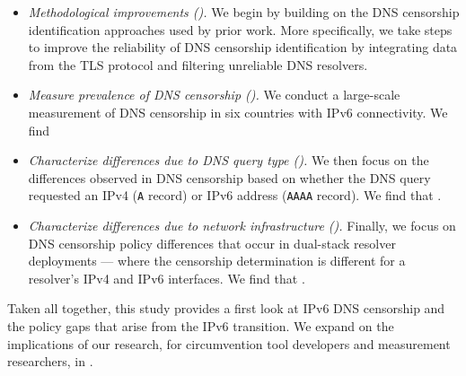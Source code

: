 \begin{itemize}

  \item {\it Methodological improvements ().} 
    We begin by building on the DNS censorship identification approaches used
    by prior work. More specifically, we take steps to improve the reliability
    of DNS censorship identification by integrating data from the TLS protocol
    and filtering unreliable DNS resolvers.

  \item {\it Measure prevalence of DNS censorship ().} 
    We conduct a large-scale measurement of DNS censorship in six countries
    with IPv6 connectivity. We find 

  \item {\it Characterize differences due to DNS query type
    ().} 
    We then focus on the differences observed in DNS censorship based on
    whether the DNS query requested an IPv4 ({\tt A} record) or IPv6 address
    ({\tt AAAA} record). We find that .

  \item {\it Characterize differences due to network infrastructure
    ().}
    Finally, we focus on DNS censorship policy differences that occur in
    dual-stack resolver deployments --- \ie where the censorship determination
    is different for a resolver's IPv4 and IPv6 interfaces. We find that
    .

\end{itemize}

Taken all together, this study provides a first look at IPv6 DNS censorship and
the policy gaps that arise from the IPv6 transition. We expand on the
implications of our research, for circumvention tool developers and measurement
researchers, in .
